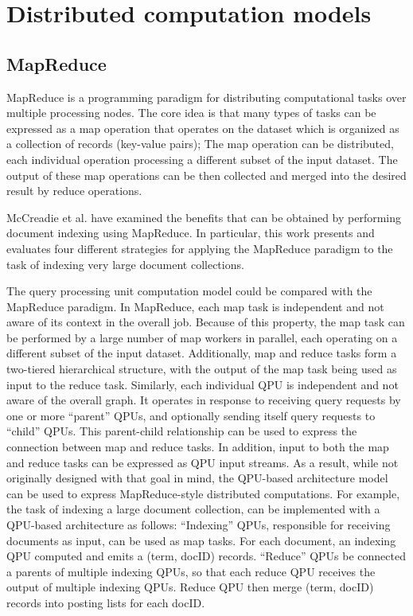 \section{Distributed computation models}
\label{sec:dataflowmapreduce}

\subsection{MapReduce}

MapReduce \cite{dean:mapreduce} is a programming paradigm for distributing computational tasks over multiple processing nodes.
The core idea is that many types of tasks can be expressed as a map operation that operates on the dataset which is organized
as a collection of records (key-value pairs);
The map operation can be distributed, each individual operation processing a different subset of the input dataset.
The output of these map operations can be then collected and merged into the desired result by reduce operations.

McCreadie et al. \cite{mccreadie:mapreduceindexing} have examined the benefits that can be obtained by performing document
indexing using MapReduce.
In particular, this work presents and evaluates four different strategies for applying the MapReduce paradigm
to the task of indexing very large document collections.

The query processing unit computation model could be compared with the MapReduce paradigm.
In MapReduce, each map task is independent and not aware of its context in the overall job.
Because of this property, the map task can be performed by a large number of map workers in parallel,
each operating on a different subset of the input dataset.
Additionally, map and reduce tasks form a two-tiered hierarchical structure,
with the output of the map task being used as input to the reduce task.
Similarly, each individual QPU is independent and not aware of the overall graph.
It operates in response to receiving query requests by one or more ``parent'' QPUs,
and optionally sending itself query requests to ``child'' QPUs.
This parent-child relationship can be used to express the connection between map and reduce tasks.
In addition, input to both the map and reduce tasks can be expressed as QPU input streams.
As a result, while not originally designed with that goal in mind,
the QPU-based architecture model can be used to express MapReduce-style distributed computations.
For example, the task of indexing a large document collection, can be implemented with a QPU-based architecture
as follows:
``Indexing'' QPUs, responsible for receiving documents as input, can be used as map tasks.
For each document, an indexing QPU computed and emits a (term, docID) records.
``Reduce'' QPUs be connected a parents of multiple indexing QPUs,
so that each reduce QPU receives the output of multiple indexing QPUs.
Reduce QPU then merge (term, docID) records into posting lists for each docID.

